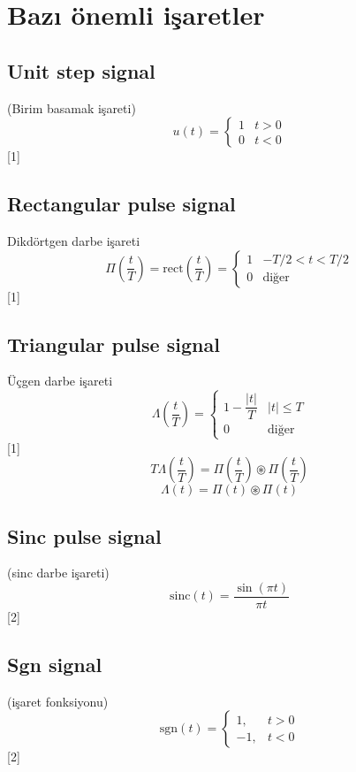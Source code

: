 \documentclass[11pt,a4paper]{article}
\begin{document}

\section{Bazı önemli işaretler}

\subsection{Unit step signal}
(Birim basamak işareti)
\[ u(t)=\begin{cases} 1 & t>0\\ 0 & t<0 \end{cases} \]
[1]

\subsection{Rectangular pulse signal}
Dikdörtgen darbe işareti
\[ \Pi\!\left(\frac{t}{T}\right)=\mathrm{rect}\!\left(\frac{t}{T}\right)=\begin{cases} 1 & -T/2<t<T/2\\ 0 & \text{diğer}\end{cases} \]
[1]

\subsection{Triangular pulse signal}
Üçgen darbe işareti
\[ \Lambda\!\left(\frac{t}{T}\right)=\begin{cases} 1-\dfrac{|t|}{T} & |t|\le T\\ 0 & \text{diğer}\end{cases} \]
[1]
\[ T\Lambda\!\left(\frac{t}{T}\right)=\Pi\!\left(\frac{t}{T}\right)\circledast\Pi\!\left(\frac{t}{T}\right) \]
\[ \Lambda(t)=\Pi(t)\circledast\Pi(t) \]

\subsection{Sinc pulse signal}
(sinc darbe işareti)
\[ \mathrm{sinc}(t)=\frac{\sin(\pi t)}{\pi t} \]
[2]

\subsection{Sgn signal}
(işaret fonksiyonu)
\[ \mathrm{sgn}(t)=\begin{cases} 1, & t>0\\ -1, & t<0 \end{cases} \]
[2]
\end{document}
